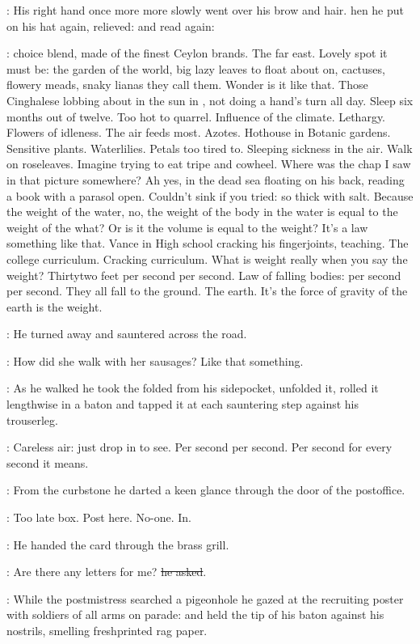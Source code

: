 :
His right hand once more more slowly went over his brow and hair. 
hen he put on his hat again, relieved:
and read again:

\BloomInt:
choice blend, made of the finest Ceylon brands.
The far east.
Lovely spot it must be:
the garden of the world,
big lazy leaves to float about on,
cactuses, flowery meads,
snaky lianas they call them.
Wonder is it like that.
Those Cinghalese lobbing about in the sun in ,
not doing a hand's turn all day.
Sleep six months out of twelve.
Too hot to quarrel.
Influence of the climate.
Lethargy.
Flowers of idleness.
The air feeds most.
Azotes.
Hothouse in Botanic gardens.
Sensitive plants.
Waterlilies.
Petals too tired to.
Sleeping sickness in the air.
Walk on roseleaves.
Imagine trying to eat tripe and cowheel.
Where was the chap I saw in that picture somewhere?
Ah yes, in the dead sea floating on his back,
reading a book with a parasol open.
Couldn't sink if you tried:
so thick with salt.
Because the weight of the water,
no, the weight of the
body in the water
is equal to the weight of the what?
Or is it the volume
is equal to the weight?
It's a law something like that.
Vance in High school cracking his fingerjoints, teaching.
The college curriculum.
Cracking curriculum.
What is weight really when you say the weight?
Thirtytwo feet per second per second.
Law of falling bodies:
per second per second.
They all fall to the ground.
The earth.
It's the force of gravity of the earth
is the weight.

:
He turned away and sauntered across the road.

\BloomInt:
How did she walk with her sausages?
Like that something.

:
As he walked he took the folded  from his sidepocket,
unfolded it, rolled it lengthwise in a baton
and tapped it at each sauntering step against his trouserleg.

\BloomInt:
Careless air: just drop in to see.
Per second per second.
Per second for every second
it means.

:
From the curbstone
he darted a keen glance through the door of the postoffice.

\BloomInt:
Too late box.
Post here.
No-one.
In.

:
He handed the card through the brass grill.

\Bloom:
Are there any letters for me?
\sout{he asked}.

:
While the postmistress searched a pigeonhole
he gazed at the recruiting poster with soldiers of all arms on parade:
and held the tip of his baton against his nostrils,
smelling freshprinted rag paper.


